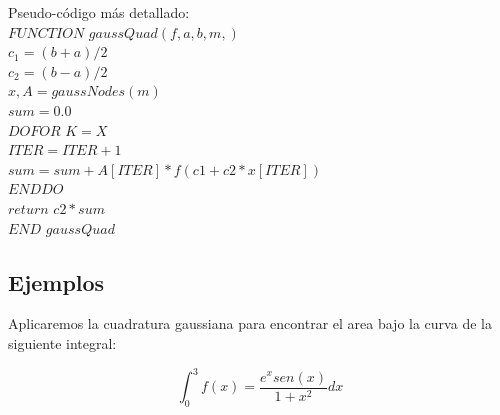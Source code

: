 \documentclass[journal,transmag]{IEEEtran}
\theoremstyle{mytheoremstyle}
\theoremstyle{mytheoremstyle}
\theoremstyle{myproblemstyle}
\begin{document}
                            Pseudo-código más detallado: \cite{Numerical Methods in Engineering with Python 3} \\
                    $FUNCTION$ $ gaussQuad (f,a, b, m,)$ \\
                    $c_1=(b+a)/2$ \\
                    $c_2=(b-a)/2$ \\
                    $x,A = gaussNodes(m)$ \\
                    $sum = 0.0$\\
                    $DO FOR$ $K=X$\\
                    $ITER = ITER +1 $\\
                    $sum = sum + A[ITER]*f(c1 + c2*x[ITER])$\\
                    $END DO$\\
                    $return$ $ c2*sum$\\
                    $END$ $gaussQuad$ 
            
            \subsection{Ejemplos}
            Aplicaremos la cuadratura gaussiana para encontrar el area  bajo la curva de la siguiente integral:
            
            
                \begin{equation} 
                    \int_0^3 f(x)=\frac{e^xsen(x)}{1+x^2} dx
                \end{equation}
                
\end{document}
